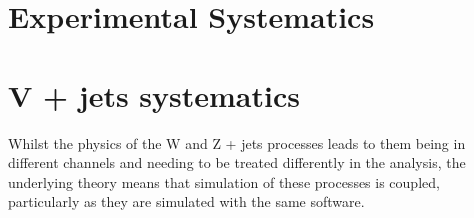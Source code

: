 



\section{Experimental Systematics}


\section{V + jets systematics}
\label{sec:zjets-shapes}
Whilst the physics of the W and Z + jets processes leads to them being in
different channels and needing to be treated differently in the analysis, the
underlying theory means that simulation of these processes is coupled,
particularly as they are simulated with the same software.

